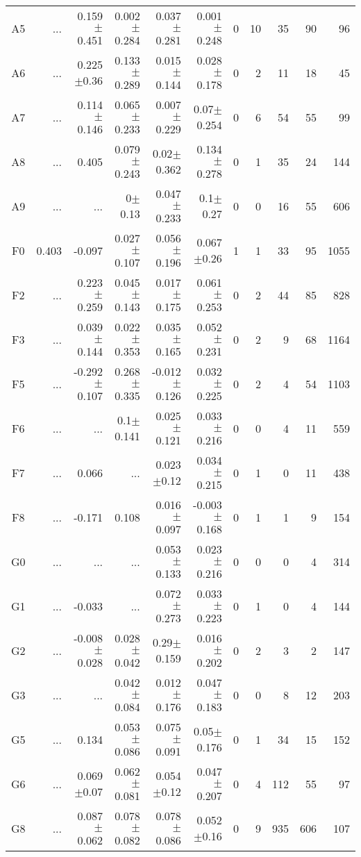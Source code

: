 \begin{table}[t]
\begin{center}
\begin{tabular}{c|rrrrr|rrrrr}
A5	&	 ...	&	0.159$\pm$0.451	&	0.002$\pm$0.284	&	0.037$\pm$0.281	&	0.001$\pm$0.248	&	0	&	10	&	35	&	90	&	96	\\
A6	&	 ...	&	0.225$\pm$0.36	&	0.133$\pm$0.289	&	0.015$\pm$0.144	&	0.028$\pm$0.178	&	0	&	2	&	11	&	18	&	45	\\
A7	&	 ...	&	0.114$\pm$0.146	&	0.065$\pm$0.233	&	0.007$\pm$0.229	&	0.07$\pm$0.254	&	0	&	6	&	54	&	55	&	99	\\
A8	&	 ...	&	0.405	&	0.079$\pm$0.243	&	0.02$\pm$0.362	&	0.134$\pm$0.278	&	0	&	1	&	35	&	24	&	144	\\
A9	&	 ...	&	 ...	&	0$\pm$0.13	&	0.047$\pm$0.233	&	0.1$\pm$0.27	&	0	&	0	&	16	&	55	&	606	\\
F0	&	0.403	&	-0.097	&	0.027$\pm$0.107	&	0.056$\pm$0.196	&	0.067$\pm$0.26	&	1	&	1	&	33	&	95	&	1055	\\
F2	&	 ...	&	0.223$\pm$0.259	&	0.045$\pm$0.143	&	0.017$\pm$0.175	&	0.061$\pm$0.253	&	0	&	2	&	44	&	85	&	828	\\
F3	&	 ...	&	0.039$\pm$0.144	&	0.022$\pm$0.353	&	0.035$\pm$0.165	&	0.052$\pm$0.231	&	0	&	2	&	9	&	68	&	1164	\\
F5	&	 ...	&	-0.292$\pm$0.107	&	0.268$\pm$0.335	&	-0.012$\pm$0.126	&	0.032$\pm$0.225	&	0	&	2	&	4	&	54	&	1103	\\
F6	&	 ...	&	 ...	&	0.1$\pm$0.141	&	0.025$\pm$0.121	&	0.033$\pm$0.216	&	0	&	0	&	4	&	11	&	559	\\
F7	&	 ...	&	0.066	&	 ...	&	0.023$\pm$0.12	&	0.034$\pm$0.215	&	0	&	1	&	0	&	11	&	438	\\
F8	&	 ...	&	-0.171	&	0.108	&	0.016$\pm$0.097	&	-0.003$\pm$0.168	&	0	&	1	&	1	&	9	&	154	\\
G0	&	 ...	&	 ...	&	 ...	&	0.053$\pm$0.133	&	0.023$\pm$0.216	&	0	&	0	&	0	&	4	&	314	\\
G1	&	 ...	&	-0.033	&	 ...	&	0.072$\pm$0.273	&	0.033$\pm$0.223	&	0	&	1	&	0	&	4	&	144	\\
G2	&	 ...	&	-0.008$\pm$0.028	&	0.028$\pm$0.042	&	0.29$\pm$0.159	&	0.016$\pm$0.202	&	0	&	2	&	3	&	2	&	147	\\
G3	&	 ...	&	 ...	&	0.042$\pm$0.084	&	0.012$\pm$0.176	&	0.047$\pm$0.183	&	0	&	0	&	8	&	12	&	203	\\
G5	&	 ...	&	0.134	&	0.053$\pm$0.086	&	0.075$\pm$0.091	&	0.05$\pm$0.176	&	0	&	1	&	34	&	15	&	152	\\
G6	&	 ...	&	0.069$\pm$0.07	&	0.062$\pm$0.081	&	0.054$\pm$0.12	&	0.047$\pm$0.207	&	0	&	4	&	112	&	55	&	97	\\
G8	&	 ...	&	0.087$\pm$0.062	&	0.078$\pm$0.082	&	0.078$\pm$0.086	&	0.052$\pm$0.16	&	0	&	9	&	935	&	606	&	107	\\

\end{tabular}
\end{center}
\end{table}
